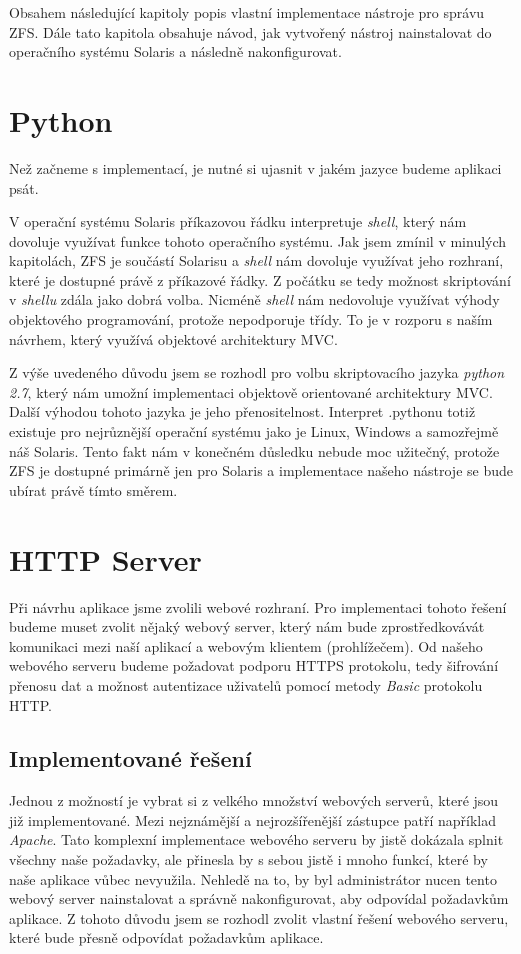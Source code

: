 Obsahem následující kapitoly popis vlastní implementace nástroje pro správu ZFS. Dále tato kapitola obsahuje návod, jak vytvořený nástroj nainstalovat do operačního systému Solaris a následně nakonfigurovat.
\section{Python}
Než začneme s implementací, je nutné si ujasnit v jakém jazyce budeme aplikaci psát.

V operační systému Solaris příkazovou řádku interpretuje \emph{shell}, který nám dovoluje využívat funkce tohoto operačního systému. Jak jsem zmínil v minulých kapitolách, ZFS je součástí Solarisu a \emph{shell} nám dovoluje využívat jeho rozhraní, které je dostupné právě z příkazové řádky. Z počátku se tedy možnost skriptování v \emph{shellu} zdála jako dobrá volba. Nicméně \emph{shell} nám nedovoluje využívat výhody objektového programování, protože nepodporuje třídy. To je v rozporu s naším návrhem, který využívá objektové architektury MVC.

Z výše uvedeného důvodu jsem se rozhodl pro volbu skriptovacího jazyka \emph{python 2.7}, který nám umožní implementaci objektově orientované architektury MVC. Další výhodou tohoto jazyka je jeho přenositelnost. Interpret \emph.{pythonu} totiž existuje pro nejrůznější operační systému jako je Linux, Windows a samozřejmě náš Solaris. Tento fakt nám v konečném důsledku nebude moc užitečný, protože ZFS je dostupné primárně jen pro Solaris a implementace našeho nástroje se bude ubírat právě tímto směrem.
\section{HTTP Server}
Při návrhu aplikace jsme zvolili webové rozhraní. Pro implementaci tohoto řešení budeme muset zvolit nějaký webový server, který nám bude zprostředkovávát komunikaci mezi naší aplikací a webovým klientem (prohlížečem). Od našeho webového serveru budeme požadovat podporu HTTPS protokolu, tedy šifrování přenosu dat a možnost autentizace uživatelů pomocí metody \emph{Basic} protokolu HTTP.
    \subsection{Implementované řešení}
    Jednou z možností je vybrat si z velkého množství webových serverů, které jsou již implementované. Mezi nejznámější a nejrozšířenější zástupce patří například \emph{Apache}. Tato komplexní implementace webového serveru by jistě dokázala splnit všechny naše požadavky, ale přinesla by s sebou jistě i mnoho funkcí, které by naše aplikace vůbec nevyužila. Nehledě na to, by byl administrátor nucen tento webový server nainstalovat a správně nakonfigurovat, aby odpovídal požadavkům aplikace. Z tohoto důvodu jsem se rozhodl zvolit vlastní řešení webového serveru, které bude přesně odpovídat požadavkům aplikace.
